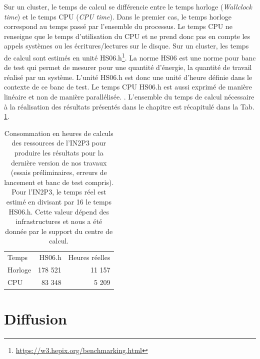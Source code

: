 Sur un cluster, le temps de calcul se différencie entre le temps horloge (\textit{Wallclock time}) et le temps CPU (\textit{CPU time}). Dans le premier cas, le temps horloge correspond au temps passé par l'ensemble du processus. Le temps CPU ne renseigne que le temps d'utilisation du CPU et ne prend donc pas en compte les appels systèmes ou les écritures/lectures sur le disque. Sur un cluster, les temps de calcul sont estimés en unité HS06.h\footnote{\url{https://w3.hepix.org/benchmarking.html}}. La norme HS06 est une norme pour banc de test qui permet de mesurer pour une quantité d'énergie, la quantité de travail réalisé par un système. L'unité HS06.h est donc une unité d'heure définie dans le contexte de ce banc de test. Le temps CPU HS06.h est aussi exprimé de manière linéaire et non de manière parallélisée. . L'ensemble du temps de calcul nécessaire à la réalisation des résultats présentés dans le chapitre \chapAnalysisN{} est récapitulé dans la Tab. \ref{tab:consumption_in2p3}.
\begin{table}
    \caption{Consommation en heures de calculs des ressources de l'IN2P3 pour produire les résultats pour la dernière version de nos travaux (essais préliminaires, erreurs de lancement et banc de test compris). Pour l'IN2P3, le temps réel est estimé en divisant par 16 le temps HS06.h. Cette valeur dépend des infrastructures et nous a été donnée par le support du centre de calcul.}
    \label{tab:consumption_in2p3}
    \centering
    \begin{tabular}{lrr}
        \hline
        Temps         & HS06.h   & Heures réelles \\
        Horloge       &  178 521 &    11 157  \\
        CPU           &  83 348  &     5 209  \\
    \end{tabular}
\end{table}
\section{Diffusion}
